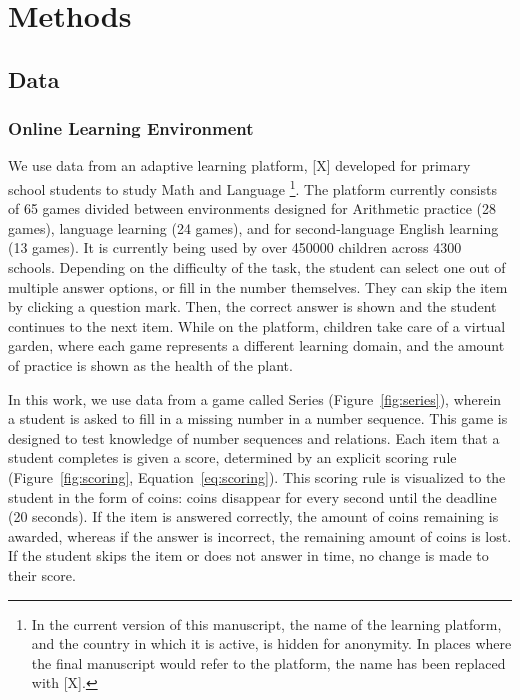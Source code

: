 \documentclass[12pt]{article}
\begin{document}
\section{Methods}
\subsection{Data}
\subsubsection{Online Learning Environment}
We use data from an adaptive learning platform, [X] developed for primary school students to study Math and Language \footnote{In the current version of this manuscript, the name of the learning platform, and the country in which it is active, is hidden for anonymity. In places where the final manuscript would refer to the platform, the name has been replaced with [X].}. The platform currently consists of 65 games divided between environments designed for Arithmetic practice (28 games), language learning (24 games), and for second-language English learning (13 games). It is currently being used by over \num{450000} children across \num{4300} schools. Depending on the difficulty of the task, the student can select one out of multiple answer options, or fill in the number themselves. They can skip the item by clicking a question mark. Then, the correct answer is shown and the student continues to the next item. While on the platform, children take care of a virtual garden, where each game represents a different learning domain, and the amount of practice is shown as the health of the plant. 

In this work, we use data from a game called Series (Figure~\ref{fig:series}), wherein a student is asked to fill in a missing number in a number sequence. This game is designed to test knowledge of number sequences and relations. Each item that a student completes is given a score, determined by an explicit scoring rule (Figure~\ref{fig:scoring}, Equation~\ref{eq:scoring}). This scoring rule is visualized to the student in the form of coins: coins disappear for every second until the deadline (20 seconds). If the item is answered correctly, the amount of coins remaining is awarded, whereas if the answer is incorrect, the remaining amount of coins is lost. If the student skips the item or does not answer in time, no change is made to their score. 
\end{document}
